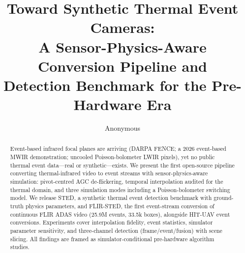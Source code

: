 \documentclass[conference]{IEEEtran}
\title{Toward Synthetic Thermal Event Cameras:\\
A Sensor-Physics-Aware Conversion Pipeline and\\
Detection Benchmark for the Pre-Hardware Era}
\author{Anonymous}
\begin{document}
\maketitle
\begin{abstract}
Event-based infrared focal planes are arriving (DARPA FENCE; a 2026
event-based MWIR demonstration; uncooled Poisson-bolometer LWIR pixels),
yet no public thermal event data---real or synthetic---exists. We present
the first open-source pipeline converting thermal-infrared video to event
streams with sensor-physics-aware simulation: pivot-centred AGC
de-flickering, temporal interpolation audited for the thermal domain, and
three simulation modes including a Poisson-bolometer switching model. We
release STED, a synthetic thermal event detection benchmark with
ground-truth physics parameters, and FLIR-STED, the first event-stream
conversion of continuous FLIR ADAS video (25.9M events, 33.5k boxes), alongside
HIT-UAV event conversions. Experiments cover interpolation fidelity, event
statistics, simulator parameter sensitivity, and three-channel detection
(frame/event/fusion) with scene slicing. All findings are framed as
simulator-conditional pre-hardware algorithm studies.
\end{abstract}








\end{document}
